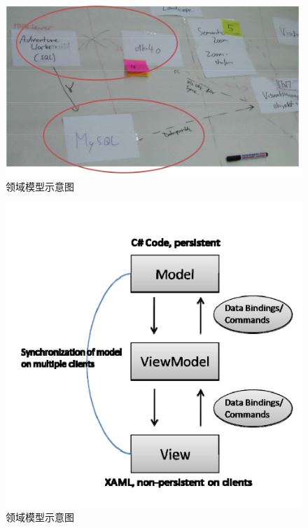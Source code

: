 \begin{figure}[!hbp]
  \begin{center}
    \includegraphics[scale=0.3]{figures/translation/translation_api_fig3.png}\\
    领域模型示意图
  \end{center}
\end{figure}

\begin{figure}[!hbp]
  \begin{center}
    \includegraphics[scale=0.3]{figures/translation/translation_api_fig4.png}\\
    领域模型示意图
  \end{center}
\end{figure}

